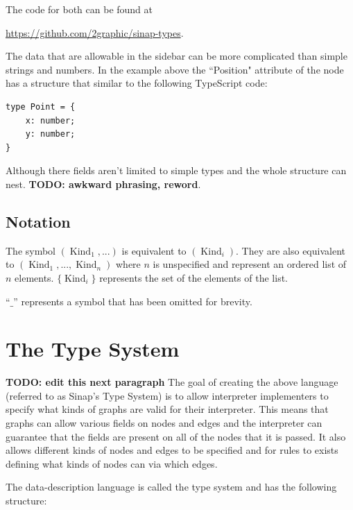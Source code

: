 \documentclass{article}
\begin{document}
\begin{multicols}{2}
The code for both can be found at 

\href{https://github.com/2graphic/sinap-types}
{https://github.com/2graphic/sinap-types}.

The data that are allowable in the sidebar can be more complicated than
simple strings and numbers. In the example above the ``Position" attribute
of the node has a structure that similar to the following TypeScript code:

\begin{samepage}
\begin{verbatim}
type Point = {
    x: number;
    y: number;
}
\end{verbatim}
\end{samepage}

Although there fields aren't limited to simple types and the 
whole structure can nest. \textbf{TODO: awkward phrasing, reword}. 

\subsection{Notation}
The symbol \((\operatorname{Kind}_1, ...)\) is equivalent to 
\((\operatorname{Kind}_i)\). They are also equivalent to 
\((\operatorname{Kind}_1, ..., \operatorname{Kind}_n)\)
where \(n\) is unspecified and represent an ordered list 
of \(n\) elements. \(\{\operatorname{Kind}_i\}\) represents 
the set of the elements of the list. 

``\(\_\)'' represents a symbol that has been omitted for brevity.
\end{multicols}

\section{The Type System}

\textbf{TODO: edit this next paragraph}
The goal of creating the above language (referred to as Sinap's 
Type System) is to allow interpreter implementers to specify what 
kinds of graphs are valid for their interpreter. This means that 
graphs can allow various fields on nodes and edges and the interpreter
can guarantee that the fields are present on all of the nodes that it
is passed. It also allows different kinds of nodes and edges to be 
specified and for rules to exists defining what kinds of nodes can 
via which edges. 


The data-description language is called the type system and has 
the following structure:
\end{document}
